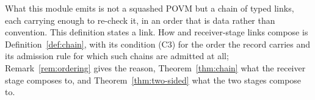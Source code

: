 
What this module emits is not a squashed POVM but a chain of typed links,
each carrying enough to re-check it, in an order that is data rather than
convention. This definition states a link. How
 and receiver-stage links compose is
Definition~\ref{def:chain}, with its condition (C3) for the order the record
carries and its admission rule for which such chains are admitted at all; Remark~\ref{rem:ordering} gives the
reason, Theorem~\ref{thm:chain} what the receiver stage composes to, and
Theorem~\ref{thm:two-sided} what the two stages compose to.

